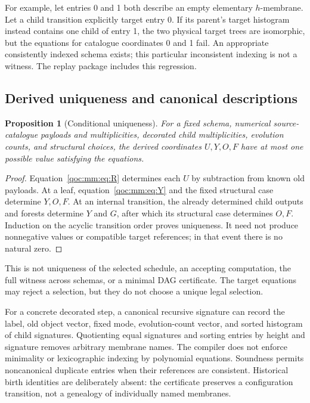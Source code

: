 \documentclass[11pt,letterpaper]{article}
\newtheorem{proposition}[theorem]{Proposition}
\theoremstyle{definition}
\theoremstyle{remark}
\begin{document}
For example, let entries 0 and 1 both describe an empty elementary $h$-membrane. Let a child transition explicitly target entry 0. If its parent's target histogram instead contains one child of entry 1, the two physical target trees are isomorphic, but the equations for catalogue coordinates 0 and 1 fail. An appropriate consistently indexed schema exists; this particular inconsistent indexing is not a witness. The replay package includes this regression.

\subsection{Derived uniqueness and canonical descriptions}
\begin{proposition}[Conditional uniqueness]\label{qoc:mm:prop:unique}
For a fixed schema, numerical source-catalogue payloads and multiplicities, decorated child multiplicities, evolution counts, and structural choices, the derived coordinates $U,Y,O,F$ have at most one possible value satisfying the equations.
\end{proposition}
\begin{proof}
Equation~\eqref{qoc:mm:eq:R} determines each $U$ by subtraction from known old payloads. At a leaf, equation~\eqref{qoc:mm:eq:Y} and the fixed structural case determine $Y,O,F$. At an internal transition, the already determined child outputs and forests determine $Y$ and $G$, after which its structural case determines $O,F$. Induction on the acyclic transition order proves uniqueness. It need not produce nonnegative values or compatible target references; in that event there is no natural zero.
\end{proof}
This is not uniqueness of the selected schedule, an accepting computation, the full witness across schemas, or a minimal DAG certificate. The target equations may reject a selection, but they do not choose a unique legal selection.

For a concrete decorated step, a canonical recursive signature can record the label, old object vector, fixed mode, evolution-count vector, and sorted histogram of child signatures. Quotienting equal signatures and sorting entries by height and signature removes arbitrary membrane names. The compiler does not enforce minimality or lexicographic indexing by polynomial equations. Soundness permits noncanonical duplicate entries when their references are consistent. Historical birth identities are deliberately absent: the certificate preserves a configuration transition, not a genealogy of individually named membranes.
\end{document}
